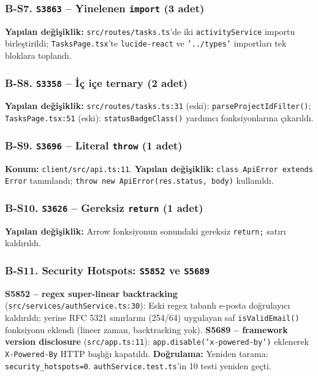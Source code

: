 \documentclass[conference]{IEEEtran}
\begin{document}
\subsubsection{B-S7. \texttt{S3863} -- Yinelenen \texttt{import} (3 adet)}
\textbf{Yapılan değişiklik:} \texttt{src/routes/tasks.ts}'de iki
\texttt{activityService} importu birleştirildi;
\texttt{TasksPage.tsx}'te \texttt{lucide-react} ve \texttt{'../types'}
importları tek bloklara toplandı.

\subsubsection{B-S8. \texttt{S3358} -- İç içe ternary (2 adet)}
\textbf{Yapılan değişiklik:}
\texttt{src/routes/tasks.ts:31} (eski): \texttt{parseProjectIdFilter()};
\texttt{TasksPage.tsx:51} (eski): \texttt{statusBadgeClass()} yardımcı
fonksiyonlarına çıkarıldı.

\subsubsection{B-S9. \texttt{S3696} -- Literal \texttt{throw} (1 adet)}
\textbf{Konum:} \texttt{client/src/api.ts:11}.
\textbf{Yapılan değişiklik:} \texttt{class ApiError extends Error}
tanımlandı; \texttt{throw new ApiError(res.status, body)} kullanıldı.

\subsubsection{B-S10. \texttt{S3626} -- Gereksiz \texttt{return} (1 adet)}
\textbf{Yapılan değişiklik:} Arrow fonksiyonun sonundaki gereksiz
\texttt{return;} satırı kaldırıldı.

\subsubsection{B-S11. Security Hotspots: \texttt{S5852} ve \texttt{S5689}}
\textbf{S5852 -- regex super-linear backtracking}
(\texttt{src/services/authService.ts:30}): Eski regex tabanlı e-posta
doğrulayıcı kaldırıldı; yerine RFC 5321 sınırlarını (254/64) uygulayan
saf \texttt{isValidEmail()} fonksiyonu eklendi (lineer zaman, backtracking
yok).
\textbf{S5689 -- framework version disclosure}
(\texttt{src/app.ts:11}): \texttt{app.disable('x-powered-by')} eklenerek
\texttt{X-Powered-By} HTTP başlığı kapatıldı.
\textbf{Doğrulama:} Yeniden tarama: \texttt{security\_hotspots=0}.
\texttt{authService.test.ts}'in 10 testi yeniden geçti.
\end{document}
